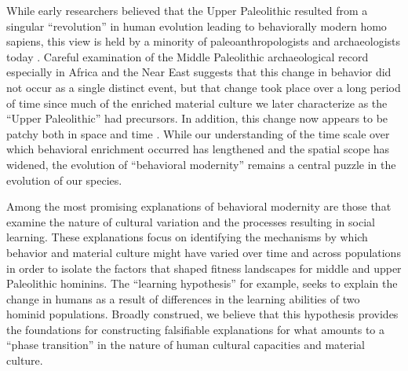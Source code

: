 \documentclass[referee,graybox,natbib]{svmult}
\begin{document}
While early researchers believed that the Upper Paleolithic resulted
from a singular ``revolution'' in human evolution leading to
behaviorally modern homo sapiens, this view is held by a minority of
paleoanthropologists and archaeologists today
\citep[e.g.,][]{klein2009human}. Careful examination of the Middle
Paleolithic archaeological record especially in Africa and the Near East
suggests that this change in behavior did not occur as a single distinct
event, but that change took place over a long period of time since much
of the enriched material culture we later characterize as the ``Upper
Paleolithic'' had precursors. In addition, this change now appears to be
patchy both in space and time
\citep{bouzouggar200782, d2007additional, d2011evolution, guy2005mosaic, mcbrearty2000revolution, mcbrearty2007down}.
While our understanding of the time scale over which behavioral
enrichment occurred has lengthened and the spatial scope has widened,
the evolution of ``behavioral modernity'' remains a central puzzle in
the evolution of our species.

Among the most promising explanations of behavioral modernity are those
that examine the nature of cultural variation and the processes
resulting in social learning. These explanations focus on identifying
the mechanisms by which behavior and material culture might have varied
over time and across populations in order to isolate the factors that
shaped fitness landscapes for middle and upper Paleolithic hominins. The
``learning hypothesis'' \citep{Nishiaki2013Introduction} for example,
seeks to explain the change in humans as a result of differences in the
learning abilities of two hominid populations. Broadly construed, we
believe that this hypothesis provides the foundations for constructing
falsifiable explanations for what amounts to a ``phase transition'' in
the nature of human cultural capacities and material culture.
\end{document}

